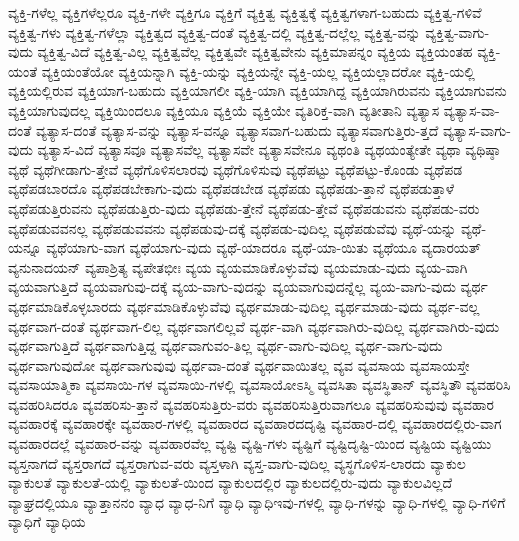 {ವ್ಯಕ್ತಿ-ಗಳೆಲ್ಲ
ವ್ಯಕ್ತಿಗಳೆಲ್ಲರೂ
ವ್ಯಕ್ತಿ-ಗಳೇ
ವ್ಯಕ್ತಿಗೂ
ವ್ಯಕ್ತಿಗೆ
ವ್ಯಕ್ತಿತ್ವ
ವ್ಯಕ್ತಿತ್ವಕ್ಕೆ
ವ್ಯಕ್ತಿತ್ವಗಳಾಗ-ಬಹುದು
ವ್ಯಕ್ತಿತ್ವ-ಗಳಿವೆ
ವ್ಯಕ್ತಿತ್ವ-ಗಳು
ವ್ಯಕ್ತಿತ್ವ-ಗಳೆಲ್ಲಾ
ವ್ಯಕ್ತಿತ್ವದ
ವ್ಯಕ್ತಿತ್ವ-ದಂತೆ
ವ್ಯಕ್ತಿತ್ವ-ದಲ್ಲಿ
ವ್ಯಕ್ತಿತ್ವ-ದಲ್ಲೆಲ್ಲ
ವ್ಯಕ್ತಿತ್ವ-ವನ್ನು
ವ್ಯಕ್ತಿತ್ವ-ವಾಗು-ವುದು
ವ್ಯಕ್ತಿತ್ವ-ವಿದೆ
ವ್ಯಕ್ತಿತ್ವ-ವಿಲ್ಲ
ವ್ಯಕ್ತಿತ್ವವೆಲ್ಲ
ವ್ಯಕ್ತಿತ್ವವೇ
ವ್ಯಕ್ತಿತ್ವವೇನು
ವ್ಯಕ್ತಿಮಾಪನ್ನಂ
ವ್ಯಕ್ತಿಯ
ವ್ಯಕ್ತಿಯಂತಹ
ವ್ಯಕ್ತಿ-ಯಂತೆ
ವ್ಯಕ್ತಿಯಂತೆಯೋ
ವ್ಯಕ್ತಿಯನ್ನಾಗಿ
ವ್ಯಕ್ತಿ-ಯನ್ನು
ವ್ಯಕ್ತಿಯನ್ನೇ
ವ್ಯಕ್ತಿ-ಯಲ್ಲ
ವ್ಯಕ್ತಿಯಲ್ಲಾದರೋ
ವ್ಯಕ್ತಿ-ಯಲ್ಲಿ
ವ್ಯಕ್ತಿಯಲ್ಲಿರುವ
ವ್ಯಕ್ತಿಯಾಗ-ಬಹುದು
ವ್ಯಕ್ತಿಯಾಗಲೀ
ವ್ಯಕ್ತಿ-ಯಾಗಿ
ವ್ಯಕ್ತಿಯಾಗಿದ್ದ
ವ್ಯಕ್ತಿಯಾಗಿರುವನು
ವ್ಯಕ್ತಿಯಾಗುವನು
ವ್ಯಕ್ತಿಯಾಗುವುದಲ್ಲ
ವ್ಯಕ್ತಿಯಿಂದಲೂ
ವ್ಯಕ್ತಿಯೂ
ವ್ಯಕ್ತಿಯೆ
ವ್ಯಕ್ತಿಯೇ
ವ್ಯತಿರಿಕ್ತ-ವಾಗಿ
ವ್ಯತೀತಾನಿ
ವ್ಯತ್ಯಾಸ
ವ್ಯತ್ಯಾಸ-ವಾ-ದಂತೆ
ವ್ಯತ್ಯಾಸ-ದಂತೆ
ವ್ಯತ್ಯಾಸ-ವನ್ನು
ವ್ಯತ್ಯಾಸ-ವನ್ನೂ
ವ್ಯತ್ಯಾಸವಾಗ-ಬಹುದು
ವ್ಯತ್ಯಾಸವಾಗುತ್ತಿರು-ತ್ತದೆ
ವ್ಯತ್ಯಾಸ-ವಾಗು-ವುದು
ವ್ಯತ್ಯಾಸ-ವಿದೆ
ವ್ಯತ್ಯಾಸವೂ
ವ್ಯತ್ಯಾಸವೆಲ್ಲ
ವ್ಯತ್ಯಾಸವೇ
ವ್ಯತ್ಯಾಸವೇನೂ
ವ್ಯಥಂತಿ
ವ್ಯಥಯಂತ್ಯೇತೇ
ವ್ಯಥಾ
ವ್ಯಥಿಷ್ಠಾ
ವ್ಯಥೆ
ವ್ಯಥೆಗೀಡಾಗು-ತ್ತೇವೆ
ವ್ಯಥೆಗೊಳಿಸಲಾರವು
ವ್ಯಥೆಗೊಳಿಸುವು
ವ್ಯಥೆಪಟ್ಟು
ವ್ಯಥೆಪಟ್ಟು-ಕೊಂಡು
ವ್ಯಥೆಪಡ
ವ್ಯಥೆಪಡಬಾರದೊ
ವ್ಯಥೆಪಡಬೇಕಾಗು-ವುದು
ವ್ಯಥೆಪಡಬೇಡ
ವ್ಯಥೆಪಡು
ವ್ಯಥೆಪಡು-ತ್ತಾನೆ
ವ್ಯಥೆಪಡುತ್ತಾಳೆ
ವ್ಯಥೆಪಡುತ್ತಿರುವನು
ವ್ಯಥೆಪಡುತ್ತಿರು-ವುದು
ವ್ಯಥೆಪಡು-ತ್ತೇನೆ
ವ್ಯಥೆಪಡು-ತ್ತೇವೆ
ವ್ಯಥೆಪಡುವನು
ವ್ಯಥೆಪಡು-ವರು
ವ್ಯಥೆಪಡುವವನಲ್ಲ
ವ್ಯಥೆಪಡುವವನು
ವ್ಯಥೆಪಡುವು-ದಕ್ಕೆ
ವ್ಯಥೆಪಡು-ವುದಿಲ್ಲ
ವ್ಯಥೆಪಡುವೆವು
ವ್ಯಥೆ-ಯನ್ನು
ವ್ಯಥೆ-ಯನ್ನೂ
ವ್ಯಥೆಯಾಗು-ವಾಗ
ವ್ಯಥೆಯಾಗು-ವುದು
ವ್ಯಥೆ-ಯಾದರೂ
ವ್ಯಥೆ-ಯಾ-ಯಿತು
ವ್ಯಥೆಯೂ
ವ್ಯದಾರಯತ್
ವ್ಯನುನಾದಯನ್
ವ್ಯಪಾಶ್ರಿತ್ಯ
ವ್ಯಪೇತಭೀಃ
ವ್ಯಯ
ವ್ಯಯಮಾಡಿಕೊಳ್ಳುವೆವು
ವ್ಯಯಮಾಡು-ವುದು
ವ್ಯಯ-ವಾಗಿ
ವ್ಯಯವಾಗುತ್ತಿದೆ
ವ್ಯಯವಾಗುವು-ದಕ್ಕೆ
ವ್ಯಯ-ವಾಗು-ವುದನ್ನು
ವ್ಯಯವಾಗುವುದನ್ನೆಲ್ಲ
ವ್ಯಯ-ವಾಗು-ವುದು
ವ್ಯರ್ಥ
ವ್ಯರ್ಥಮಾಡಿಕೊಳ್ಳಬಾರದು
ವ್ಯರ್ಥಮಾಡಿಕೊಳ್ಳುವೆವು
ವ್ಯರ್ಥಮಾಡು-ವುದಿಲ್ಲ
ವ್ಯರ್ಥಮಾಡು-ವುದು
ವ್ಯರ್ಥ-ವಲ್ಲ
ವ್ಯರ್ಥವಾಗ-ದಂತೆ
ವ್ಯರ್ಥವಾಗ-ಲಿಲ್ಲ
ವ್ಯರ್ಥವಾಗಲಿಲ್ಲವೆ
ವ್ಯರ್ಥ-ವಾಗಿ
ವ್ಯರ್ಥವಾಗಿರು-ವುದಿಲ್ಲ
ವ್ಯರ್ಥವಾಗಿರು-ವುದು
ವ್ಯರ್ಥವಾಗುತ್ತಿದೆ
ವ್ಯರ್ಥವಾಗುತ್ತಿದ್ದ
ವ್ಯರ್ಥವಾಗುವಂ-ತಿಲ್ಲ
ವ್ಯರ್ಥ-ವಾಗು-ವುದಿಲ್ಲ
ವ್ಯರ್ಥ-ವಾಗು-ವುದು
ವ್ಯರ್ಥವಾಗುವುದೋ
ವ್ಯರ್ಥವಾಗುವುವು
ವ್ಯರ್ಥವಾ-ದಂತೆ
ವ್ಯರ್ಥವಾಯಿತಲ್ಲ
ವ್ಯವ
ವ್ಯವಸಾಯ
ವ್ಯವಸಾಯಸ್ತೇ
ವ್ಯವಸಾಯಾತ್ಮಿಕಾ
ವ್ಯವಸಾಯಿ-ಗಳ
ವ್ಯವಸಾಯಿ-ಗಳಲ್ಲಿ
ವ್ಯವಸಾಯೋಽಸ್ಮಿ
ವ್ಯವಸಿತಾ
ವ್ಯವಸ್ಥಿತಾನ್
ವ್ಯವಸ್ಥಿತೌ
ವ್ಯವಹರಿಸಿ
ವ್ಯವಹರಿಸಿದರೂ
ವ್ಯವಹರಿಸು-ತ್ತಾನೆ
ವ್ಯವಹರಿಸುತ್ತಿರು-ವರು
ವ್ಯವಹರಿಸುತ್ತಿರುವಾಗಲೂ
ವ್ಯವಹರಿಸುವುವು
ವ್ಯವಹಾರ
ವ್ಯವಹಾರಕ್ಕೆ
ವ್ಯವಹಾರಕ್ಕೇ
ವ್ಯವಹಾರ-ಗಳಲ್ಲಿ
ವ್ಯವಹಾರದ
ವ್ಯವಹಾರದದೃಷ್ಟಿ
ವ್ಯವಹಾರ-ದಲ್ಲಿ
ವ್ಯವಹಾರದಲ್ಲಿರು-ವಾಗ
ವ್ಯವಹಾರದಲ್ಲೆ
ವ್ಯವಹಾರ-ವನ್ನು
ವ್ಯವಹಾರವೆಲ್ಲ
ವ್ಯಷ್ಟಿ
ವ್ಯಷ್ಟಿ-ಗಳು
ವ್ಯಷ್ಟಿಗೆ
ವ್ಯಷ್ಟಿದೃಷ್ಟಿ-ಯಿಂದ
ವ್ಯಷ್ಟಿಯ
ವ್ಯಷ್ಟಿಯು
ವ್ಯಸ್ತನಾಗದೆ
ವ್ಯಸ್ತರಾಗದೆ
ವ್ಯಸ್ತರಾಗುವ-ವರು
ವ್ಯಸ್ತಳಾಗಿ
ವ್ಯಸ್ತ-ವಾಗು-ವುದಿಲ್ಲ
ವ್ಯಸ್ಥಗೊಳಿಸ-ಲಾರದು
ವ್ಯಾಕುಲ
ವ್ಯಾಕುಲತೆ
ವ್ಯಾಕುಲತೆ-ಯಲ್ಲಿ
ವ್ಯಾಕುಲತೆ-ಯಿಂದ
ವ್ಯಾಕುಲದಲ್ಲಿರ
ವ್ಯಾಕುಲದಲ್ಲಿರು-ವುದು
ವ್ಯಾಕುಲವಿಲ್ಲದೆ
ವ್ಯಾಘ್ರದಲ್ಲಿಯೂ
ವ್ಯಾತ್ತಾನನಂ
ವ್ಯಾಧ
ವ್ಯಾಧ-ನಿಗೆ
ವ್ಯಾಧಿ
ವ್ಯಾಧಿಇವು-ಗಳಲ್ಲಿ
ವ್ಯಾಧಿ-ಗಳನ್ನು
ವ್ಯಾಧಿ-ಗಳಲ್ಲಿ
ವ್ಯಾಧಿ-ಗಳಿಗೆ
ವ್ಯಾಧಿಗೆ
ವ್ಯಾಧಿಯ
}

